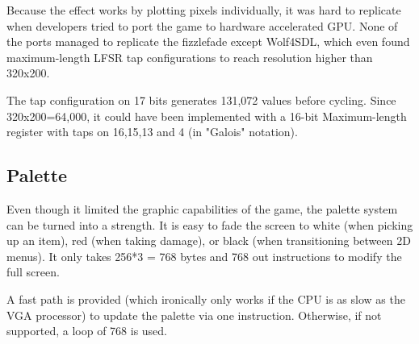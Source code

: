  Because the effect works by plotting pixels individually, it was hard to replicate when developers tried to port the game to hardware accelerated GPU. None of the ports managed to replicate the fizzlefade except Wolf4SDL, which even found maximum-length LFSR tap configurations to reach resolution higher than 320x200.\\
\par
{} The tap configuration on 17 bits generates 131,072 values before cycling. Since 320x200=64,000, it could have been implemented with a 16-bit Maximum-length register with taps on 16,15,13 and 4 (in "Galois" notation).










\subsection{Palette}
Even though it limited the graphic capabilities of the game, the palette system can be turned into a strength. It is easy to fade the screen to white (when picking up an item), red (when taking damage), or black (when transitioning between 2D menus). It only takes 256*3 = 768 bytes and 768 out instructions to modify the full screen.\\
\par

 \hspace{40pt}\par
 \vspace{15pt}
 \hspace{40pt}\par
 \vspace{15pt}
 \hspace{40pt}\par
\pagebreak

A fast path is provided (which ironically only works if the CPU is as slow as the VGA processor) to update the palette via one  instruction. Otherwise, if not supported, a loop of 768  is used.\\
\par
\begin{minipage}{\linewidth}

\end{minipage}








